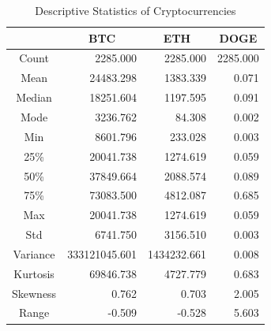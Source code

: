 \documentclass{ieeeojies}
\begin{document}
\begin{table}[H]
    \centering
    \renewcommand{\arraystretch}{1.2} %
    \begin{tabular}{|c|r|r|r|}
        \hline
                & \multicolumn{1}{c|}{\textbf{BTC}} & \multicolumn{1}{c|}{\textbf{ETH}} & \multicolumn{1}{c|}{\textbf{DOGE}} \\
        \hline
        Count    & 2285.000 & 2285.000 & 2285.000 \\
        \hline
        Mean     & 24483.298 & 1383.339 & 0.071 \\
        \hline
        Median   & 18251.604 & 1197.595 & 0.091 \\
        \hline
        Mode     & 3236.762 & 84.308 & 0.002 \\
        \hline
        Min      & 8601.796 & 233.028 & 0.003 \\
        \hline
        25\%     & 20041.738 & 1274.619 & 0.059 \\
        \hline
        50\%     & 37849.664 & 2088.574 & 0.089 \\
        \hline
        75\%     & 73083.500 & 4812.087 & 0.685 \\
        \hline
        Max      & 20041.738 & 1274.619 & 0.059 \\
        \hline
        Std      & 6741.750 & 3156.510 & 0.003 \\
        \hline
        Variance & 333121045.601 & 1434232.661 & 0.008 \\
        \hline
        Kurtosis & 69846.738 & 4727.779 & 0.683 \\
        \hline
        Skewness & 0.762 & 0.703 & 2.005 \\
        \hline
        Range    & -0.509 & -0.528 & 5.603 \\
        \hline
    \end{tabular}
    \caption{Descriptive Statistics of Cryptocurrencies}
    \label{table:1}
\end{table}
\end{document}
